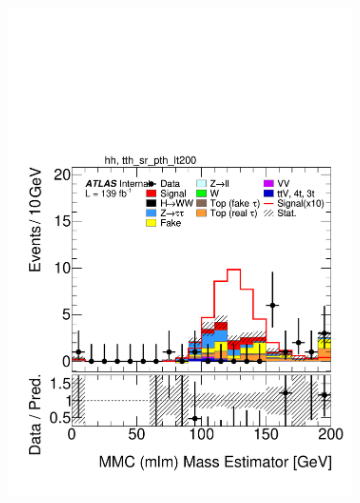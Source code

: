 \begin{figure}[h]
  \begin{subfigure}[b]{0.32\textwidth}
    \includegraphics[width=\textwidth]{images/sr_cr_plots/plot_ditau_mmc_mlm_m_hh_tth_sr_pth_lt200.pdf}
    \caption{}
  \end{subfigure}
  \begin{subfigure}[b]{0.32\textwidth}

\end{subfigure}
\end{figure}
